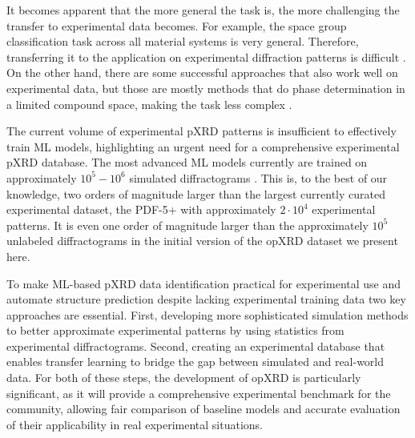 It becomes apparent that the more general the task is, the more challenging the transfer to experimental data becomes. For example, the space group classification task across all material systems is very general. Therefore, transferring it to the application on experimental diffraction patterns is difficult \cite{Schopmans2023, Lee2022, Vecsei2018}. On the other hand, there are some successful approaches that also work well on experimental data, but those are mostly methods that do phase determination in a limited compound space, making the task less complex \cite{Schuetzke2024, Lee2020}. 

The current volume of experimental pXRD patterns is insufficient to effectively train ML models, highlighting an urgent need for a comprehensive experimental pXRD database. The most advanced ML models currently are trained on approximately $10^5 - 10^6$ simulated diffractograms \cite{Salgado2023, Schopmans2023}. This is, to the best of our knowledge, two orders of magnitude larger than the largest currently curated experimental dataset, the PDF-5+ with approximately $2\cdot 10^4$ experimental patterns. It is even one order of magnitude larger than the approximately $10^5$ unlabeled diffractograms in the initial version of the opXRD dataset we present here.

To make ML-based pXRD data identification practical for experimental use and automate structure prediction despite lacking experimental training data two key approaches are essential. First, developing more sophisticated simulation methods to better approximate experimental patterns\cite{cao2024simxrd} by using statistics from experimental diffractograms. Second, creating an experimental database that enables transfer learning to bridge the gap between simulated and real-world data. For both of these steps, the development of opXRD is particularly significant, as it will provide a comprehensive experimental benchmark for the community, allowing fair comparison of baseline models and accurate evaluation of their applicability in real experimental situations.